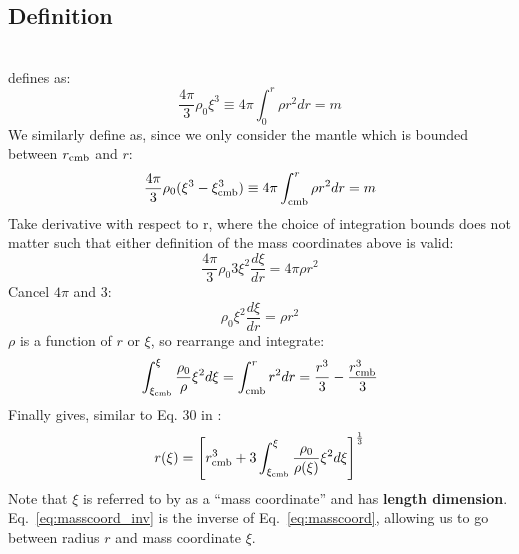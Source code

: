 \subsection{Definition}
\\

\noindent
\cite{ABE95} defines as:
\begin{equation}
\frac{4 \pi}{3} \rho_0 \xi^3 \equiv 4 \pi \int_0^r \rho r^2 dr = m
\end{equation}
We similarly define as, since we only consider the mantle which is bounded between $r_{\rm cmb}$ and $r$:
\begin{equation}
\frac{4 \pi}{3} \rho_0 (\xi^3-\xi_{\rm cmb}^3) \equiv 4 \pi \int_{\rm cmb}^r \rho r^2 dr = m
\label{eq:masscoord}
\end{equation}
Take derivative with respect to r, where the choice of integration bounds does not matter such that either definition of the mass coordinates above is valid:
\begin{equation}
\frac{4 \pi}{3} \rho_0 3 \xi^2 \frac{d \xi}{d r} = 4 \pi \rho r^2
\end{equation}
Cancel $4 \pi$ and $3$:
\begin{equation}
\rho_0 \xi^2 \frac{d \xi}{d r} = \rho r ^2
\end{equation}
$\rho$ is a function of $r$ or $\xi$, so rearrange and integrate:
\begin{equation}
\int_{\xi_{\rm cmb}}^\xi \frac{\rho_0}{\rho} \xi^2 d\xi = \int_{\rm cmb}^r r^2 dr = \frac{r^3}{3} - \frac{r_{\rm cmb}^3}{3}
\end{equation}
Finally gives, similar to Eq. 30 in \cite{ABE95}:
\begin{equation}
r(\xi) = \left[ r_{\rm cmb}^3 + 3 \int_{\xi_{\rm cmb}}^\xi \frac{\rho_0}{\rho(\xi)} \xi^2 d\xi \right]^\frac{1}{3}
\label{eq:masscoord_inv}
\end{equation}
Note that $\xi$ is referred to by \cite{ABE95} as a ``mass coordinate'' and has \textbf{length dimension}.  Eq.~\ref{eq:masscoord_inv} is the inverse of Eq.~\ref{eq:masscoord}, allowing us to go between radius $r$ and mass coordinate $\xi$.
